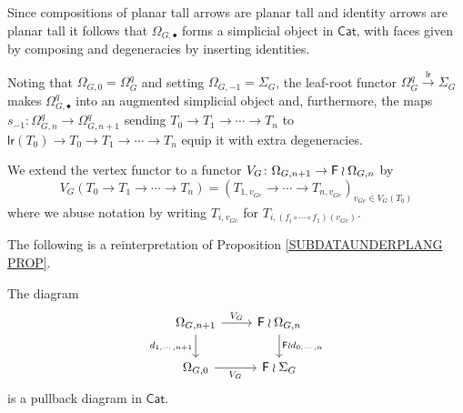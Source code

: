 \documentclass[a4paper,10pt]{article}%
\begin{document}
\begin{notation}\label{SIMPOPERATORS NOT}
	Since compositions of planar tall arrows are planar tall
	and identity arrows are planar tall	
	it follows that 
	$\Omega_{G,\bullet}$
	forms a simplicial object in $\mathsf{Cat}$, 
	with faces given by composing and degeneracies by inserting identities. 

	Noting that $\Omega_{G,0} = \Omega_G^q$ and setting 
	$\Omega_{G,-1} = \Sigma_G$, the leaf-root functor $\Omega_G^q \xrightarrow{\mathsf{lr}} \Sigma_G$ makes 
	$\Omega_{G,\bullet}^q$ into an augmented simplicial object and, furthermore, the maps 
	$s_{-1} \colon \Omega_{G,n}^q \to \Omega_{G,n+1}^q$
sending $T_0 \to T_1 \to \cdots \to T_n$ to 
$\mathsf{lr}(T_0) \to T_0 \to T_1 \to \cdots \to T_n$ equip it with extra degeneracies.
\end{notation}


\begin{notation}
We extend the vertex functor to a functor 
$V_G \colon \Omega_{G,n+1} \to \mathsf{F} \wr \Omega_{G,n}$
by
\begin{equation}\label{VGDEF EQ}
	V_G(T_0 \to T_1 \to \cdots \to T_n) = 
	(T_{1,v_{Ge}} \to \cdots \to
	T_{n,v_{Ge}})_{v_{Ge} \in V_G(T_0)}	
\end{equation}
where we abuse notation by writing $T_{i,v_{Ge}}$
for $T_{i, (f_i\circ \cdots \circ f_1)(v_{Ge})}$.
\end{notation}


The following is a reinterpretation of Proposition \ref{SUBDATAUNDERPLANG PROP}.

\begin{proposition} \label{SUBSASPULL PROP}
The diagram
	\begin{equation}\label{PTPULL EQ}
	\begin{tikzcd}
		\Omega_{G,n+1} \ar{r}{V_G} 
		\ar{d}[swap]{d_{1,\cdots,n+1}} & \Fin \wr \Omega_{G,n} 
		\ar{d}{\Fin \wr d_{0,\cdots,n}}
	\\
		\Omega_{G,0} \ar{r}[swap]{V_G} & \Fin \wr \Sigma_G
	\end{tikzcd}
	\end{equation}
is a pullback diagram in $\mathsf{Cat}$.
\end{proposition}
\end{document}
